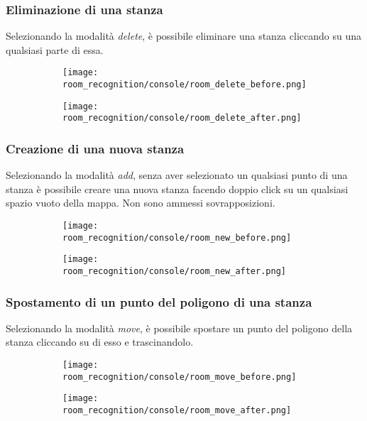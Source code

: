 \subsubsection{Eliminazione di una stanza}
Selezionando la modalità \textit{delete}, è possibile eliminare una stanza cliccando su una qualsiasi parte di essa.
\begin{figure}[H]
  \begin{subfigure}[t]{0.50\textwidth}
    \centering
    \texttt{[image: room\_recognition/console/room\_delete\_before.png]}
  \end{subfigure}
  \begin{subfigure}[t]{0.50\textwidth}
    \centering
    \texttt{[image: room\_recognition/console/room\_delete\_after.png]}
  \end{subfigure}
\end{figure}

\protect
\subsubsection{Creazione di una nuova stanza}
Selezionando la modalità \textit{add}, senza aver selezionato un qualsiasi punto di una stanza è possibile creare una nuova stanza facendo doppio click su un qualsiasi spazio vuoto della mappa. Non sono ammessi sovrapposizioni.
\begin{figure}[H]
  \begin{subfigure}[t]{0.50\textwidth}
    \centering
    \texttt{[image: room\_recognition/console/room\_new\_before.png]}
  \end{subfigure}
  \begin{subfigure}[t]{0.50\textwidth}
    \centering
    \texttt{[image: room\_recognition/console/room\_new\_after.png]}
  \end{subfigure}
\end{figure}

\protect
\subsubsection{Spostamento di un punto del poligono di una stanza}
Selezionando la modalità \textit{move}, è possibile spostare un punto del poligono della stanza cliccando su di esso e trascinandolo.
\begin{figure}[H]
  \begin{subfigure}[t]{0.50\textwidth}
    \centering
    \texttt{[image: room\_recognition/console/room\_move\_before.png]}
  \end{subfigure}
  \begin{subfigure}[t]{0.50\textwidth}
    \centering
    \texttt{[image: room\_recognition/console/room\_move\_after.png]}
  \end{subfigure}
\end{figure}

